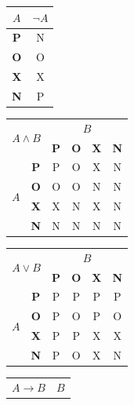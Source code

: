 \documentclass[a4paper, 11pt] {article}
\begin{document}
\begin{table}[h]\centering
\begin{tabular}{|c|c|}
\hline
$A$        & $\neg A$ \\ \hline
\textbf{P} & N \\ \hline
\textbf{O} & O \\ \hline
\textbf{X} & X \\ \hline
\textbf{N} & P \\ \hline
\end{tabular}
\begin{tabular}{|c|c|c|c|c|c|}
\hline
\multicolumn{2}{|c|}{\multirow{2}{*}{$A \wedge B$}} & \multicolumn{4}{c|}{$B$}         \\ \cline{3-6} 
\multicolumn{2}{|c|}{}             & \textbf{P} & \textbf{O} & \textbf{X} & \textbf{N} \\ \hline
\multirow{4}{*}{$A$}  & \textbf{P} & P          & O          & X          & N          \\ \cline{2-6} 
                      & \textbf{O} & O          & O          & N          & N          \\ \cline{2-6} 
                      & \textbf{X} & X          & N          & X          & N          \\ \cline{2-6} 
                      & \textbf{N} & N          & N          & N          & N          \\ \hline
\end{tabular}
\begin{tabular}{|c|c|c|c|c|c|}
\hline
\multicolumn{2}{|c|}{\multirow{2}{*}{$A \vee B$}} & \multicolumn{4}{c|}{$B$}           \\ \cline{3-6} 
\multicolumn{2}{|c|}{}             & \textbf{P} & \textbf{O} & \textbf{X} & \textbf{N} \\ \hline
\multirow{4}{*}{$A$}  & \textbf{P} & P          & P          & P          & P          \\ \cline{2-6} 
                      & \textbf{O} & P          & O          & P          & O          \\ \cline{2-6} 
                      & \textbf{X} & P          & P          & X          & X          \\ \cline{2-6} 
                      & \textbf{N} & P          & O          & X          & N          \\ \hline
\end{tabular}
\begin{tabular}{|c|c|c|c|c|c|}
\hline
\multicolumn{2}{|c|}{\multirow{2}{*}{$A \rightarrow B$}} & \multicolumn{4}{c|}{$B$}   \\ \cline{3-6} 

\end{tabular}
\end{table}
\end{document}
